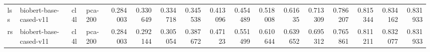 \begin{tabular}{llllrrrrrrrrrrrrr}
 lss         & biobert-base-cased-v11 & cl4l             & pca-200               &     0.284003 &     0.330649 &     0.334718 &     0.345538 &     0.413096 &     0.454489 &     0.518008 &     0.61635  &     0.713309 &     0.786207 &      0.815344 &      0.834162 &      0.831933 \\
 rs          & biobert-base-cased-v11 & cl4l             & pca-200               &     0.284003 &     0.292144 &     0.305054 &     0.387672 &     0.47123  &     0.551499 &     0.610644 &     0.639652 &     0.695312 &     0.765861 &      0.811211 &      0.832077 &      0.831933 \\
\hline
\end{tabular}